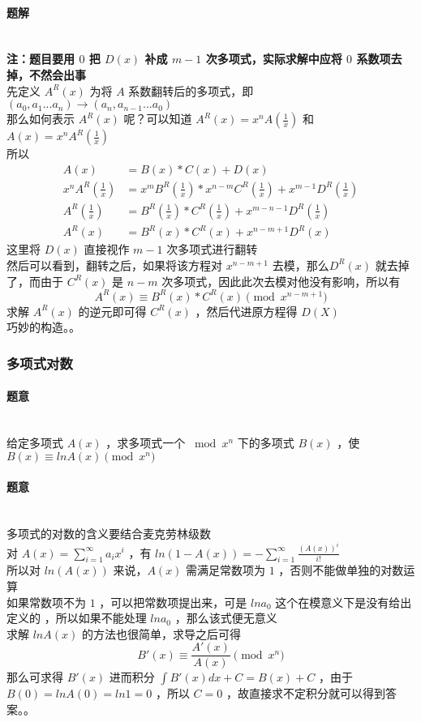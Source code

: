 	\paragraph{题解}~\\
	\textbf{注：题目要用 $0$ 把 $D(x)$ 补成 $m-1$ 次多项式，实际求解中应将 $0$ 系数项去掉，不然会出事}\\
	先定义 $A^R(x)$ 为将 $A$ 系数翻转后的多项式，即 $(a_0,a_1...a_n)\rightarrow(a_n,a_{n-1}...a_0)$\\
	那么如何表示 $A^R(x)$ 呢？可以知道 $A^R(x)=x^nA(\frac{1}{x})$ 和 $A(x)=x^nA^R(\frac{1}{x})$\\
	所以
	$$
	\begin{aligned}
	A(x)&=B(x)*C(x)+D(x)\\
	x^nA^R(\frac{1}{x})&=x^mB^R(\frac{1}{x})*x^{n-m}C^R(\frac{1}{x})+x^{m-1}D^R(\frac{1}{x})\\
	A^R(\frac{1}{x})&=B^R(\frac{1}{x})*C^R(\frac{1}{x})+x^{m-n-1}D^R(\frac{1}{x})\\
	A^R(x)&=B^R(x)*C^R(x)+x^{n-m+1}D^R(x)
	\end{aligned}
	$$
	这里将 $D(x)$ 直接视作 $m-1$ 次多项式进行翻转\\
	然后可以看到，翻转之后，如果将该方程对 $x^{n-m+1}$ 去模，那么$D^R(x)$ 就去掉了，而由于 $C^R(x)$ 是 $n-m$ 次多项式，因此此次去模对他没有影响，所以有
	$$
	A^R(x)\equiv B^R(x)*C^R(x)\pmod{x^{n-m+1}}
	$$
	求解 $A^R(x)$ 的逆元即可得 $C^R(x)$ ，然后代进原方程得 $D(X)$\\
	巧妙的构造。。\\
	\vspace{1cm}
	\subsubsection{多项式对数}
	\paragraph{题意}~\\
	给定多项式 $A(x)$ ，求多项式一个 $\bmod x^n$ 下的多项式 $B(x)$ ，使 $B(x)\equiv lnA(x)\pmod{x^n}$
	\paragraph{题意}~\\
	多项式的对数的含义要结合麦克劳林级数\\
	对 $\displaystyle A(x)=\sum_{i=1}^{\infty}a_ix^i$ ，有 $\displaystyle ln(1-A(x))=-\sum_{i=1}^{\infty}\frac{(A(x))^i}{i!}$\\
	所以对 $ln(A(x))$ 来说，$A(x)$ 需满足常数项为 $1$ ，否则不能做单独的对数运算\\
	如果常数项不为 $1$ ，可以把常数项提出来，可是 $ln a_0$ 这个在模意义下是没有给出定义的 ，所以如果不能处理 $ln a_0$ ，那么该式便无意义\\
	求解 $lnA(x)$ 的方法也很简单，求导之后可得
	$$
	B'(x)\equiv\frac{A'(x)}{A(x)}\pmod{x^n}
	$$
	那么可求得 $B'(x)$ 进而积分 $\int B'(x)dx+C= B(x)+C$ ，由于 $B(0)=ln A(0)=ln 1=0$ ，所以 $C=0$ ，故直接求不定积分就可以得到答案。。\\
	\vspace{1cm}

